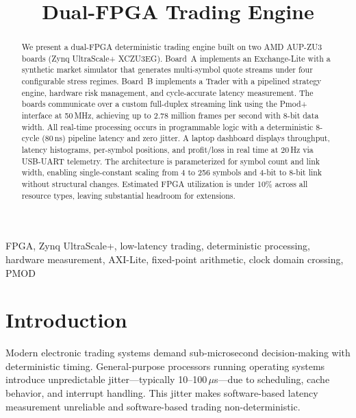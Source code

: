 \documentclass[conference]{IEEEtran}
\begin{document}
\title{Dual-FPGA Trading Engine}

\author{
}

\maketitle

\begin{abstract}
We present a dual-FPGA deterministic trading engine built on two AMD AUP-ZU3 boards (Zynq UltraScale+ XCZU3EG). Board~A implements an Exchange-Lite with a synthetic market simulator that generates multi-symbol quote streams under four configurable stress regimes. Board~B implements a Trader with a pipelined strategy engine, hardware risk management, and cycle-accurate latency measurement. The boards communicate over a custom full-duplex streaming link using the Pmod+ interface at 50\,MHz, achieving up to 2.78 million frames per second with 8-bit data width. All real-time processing occurs in programmable logic with a deterministic 8-cycle (80\,ns) pipeline latency and zero jitter. A laptop dashboard displays throughput, latency histograms, per-symbol positions, and profit/loss in real time at 20\,Hz via USB-UART telemetry. The architecture is parameterized for symbol count and link width, enabling single-constant scaling from 4 to 256 symbols and 4-bit to 8-bit link without structural changes. Estimated FPGA utilization is under 10\% across all resource types, leaving substantial headroom for extensions.
\end{abstract}

\begin{IEEEkeywords}
FPGA, Zynq UltraScale+, low-latency trading, deterministic processing, hardware measurement, AXI-Lite, fixed-point arithmetic, clock domain crossing, PMOD
\end{IEEEkeywords}

\section{Introduction}

Modern electronic trading systems demand sub-microsecond decision-making with deterministic timing. General-purpose processors running operating systems introduce unpredictable jitter---typically 10--100\,$\mu$s---due to scheduling, cache behavior, and interrupt handling. This jitter makes software-based latency measurement unreliable and software-based trading non-deterministic.
\end{document}
